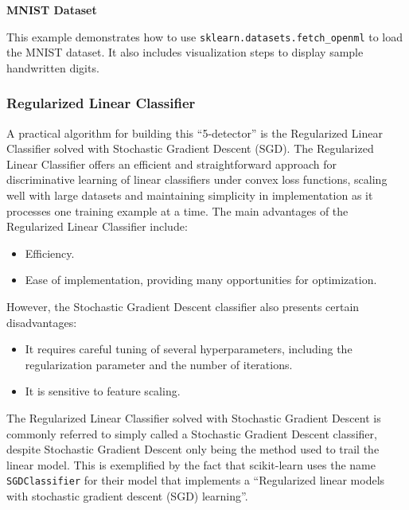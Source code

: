 \documentclass[12pt,letter]{article}
\begin{document}
\begin{example}
\textbf{MNIST Dataset}

\noindent This example demonstrates how to use \texttt{sklearn.datasets.fetch\_openml} to load the MNIST dataset. It also includes  visualization steps to display sample handwritten digits.
\end{example}



\subsubsection{Regularized Linear Classifier}

A practical algorithm for building this ``5-detector'' is the Regularized Linear Classifier solved with Stochastic Gradient Descent (SGD). The Regularized Linear Classifier offers an efficient and straightforward approach for discriminative learning of linear classifiers under convex loss functions, scaling well with large datasets and maintaining simplicity in implementation as it processes one training example at a time. The main advantages of the Regularized Linear Classifier include:
\begin{itemize}
\item Efficiency.
\item Ease of implementation, providing many opportunities for optimization.
\end{itemize}
However, the Stochastic Gradient Descent classifier also presents certain disadvantages:
\begin{itemize}
\item It requires careful tuning of several hyperparameters, including the regularization parameter and the number of iterations.
\item It is sensitive to feature scaling.
\end{itemize}

\begin{mdframed}[middlelinewidth=0.5mm]
\begin{center}
\end{center}
The Regularized Linear Classifier solved with Stochastic Gradient Descent is commonly referred to simply called a Stochastic Gradient Descent classifier, despite Stochastic Gradient Descent only being the method used to trail the linear model. This is exemplified by the fact that scikit-learn uses the name \texttt{SGDClassifier} for their model that implements a ``Regularized linear models with stochastic gradient descent (SGD) learning''. 
\end{mdframed}
\end{document}
